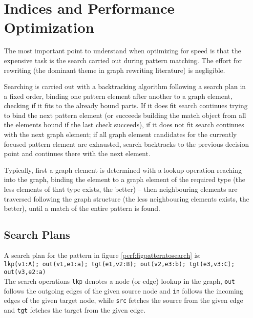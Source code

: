 \chapter{Indices and Performance Optimization}\label{cha:performance} 

The most important point to understand when optimizing for speed is that the expensive task is the search carried out during pattern matching. The effort for rewriting (the dominant theme in graph rewriting literature) is negligible.

Searching is carried out with a backtracking algorithm following a search plan in a fixed order, 
binding one pattern element after another to a graph element, checking if it fits to the already bound parts.
If it does fit search continues trying to bind the next pattern element (or succeeds building the match object from all the elements bound if the last check succeeds), if it does not fit search continues with the next graph element; if all graph element candidates for the currently focused pattern element are exhausted, search backtracks to the previous decision point and continues there with the next element.

Typically, first a graph element is determined with a lookup operation reaching into the graph, binding the element to a graph element of the required type (the less elements of that type exists, the better) -- then neighbouring elements are traversed following the graph structure (the less neighbouring elements exists, the better), until a match of the entire pattern is found.


\section{Search Plans}

A search plan for the pattern in figure \ref{perf:figpatterntosearch} is:\\
\texttt{lkp(v1:A); out(v1,e1:a); tgt(e1,v2:B); out(v2,e3:b); tgt(e3,v3:C); out(v3,e2:a)}\\
The search operations \texttt{lkp} denotes a node (or edge) lookup in the graph, \texttt{out} follows the outgoing edges of the given source node and \texttt{in} follows the incoming edges of the given target node, while \texttt{src} fetches the source from the given edge and \texttt{tgt} fetches the target from the given edge.

